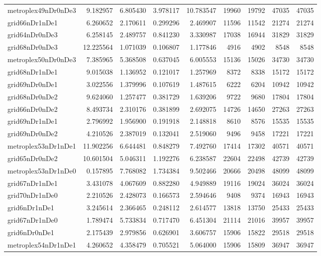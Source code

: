 \begin{longtable}{|l|r|r|r|r|r|r|r|r|}
metroplex49nDr0nDe3 & 9.182957 & 6.805430 & 3.978117 & 10.783547 & 19960 & 19792 & 47035 & 47035 \\
grid66nDr1nDe1 & 6.260652 & 2.170611 & 0.299296 & 2.469907 & 11596 & 11542 & 21274 & 21274 \\
grid64nDr0nDe3 & 6.258145 & 2.489757 & 0.841230 & 3.330987 & 17038 & 16944 & 31829 & 31829 \\
grid68nDr0nDe3 & 12.225564 & 1.071039 & 0.106807 & 1.177846 & 4916 & 4902 & 8548 & 8548 \\
metroplex50nDr0nDe3 & 7.385965 & 5.368508 & 0.637045 & 6.005553 & 15136 & 15026 & 34730 & 34730 \\
grid68nDr1nDe1 & 9.015038 & 1.136952 & 0.121017 & 1.257969 & 8372 & 8338 & 15172 & 15172 \\
grid69nDr0nDe1 & 3.022556 & 1.379996 & 0.107619 & 1.487615 & 6222 & 6204 & 10942 & 10942 \\
grid68nDr0nDe2 & 9.624060 & 1.257477 & 0.381729 & 1.639206 & 9722 & 9680 & 17804 & 17804 \\
grid66nDr0nDe2 & 8.493734 & 2.310176 & 0.381899 & 2.692075 & 14726 & 14650 & 27263 & 27263 \\
grid69nDr1nDe1 & 2.796992 & 1.956900 & 0.191918 & 2.148818 & 8610 & 8576 & 15535 & 15535 \\
grid69nDr0nDe2 & 4.210526 & 2.387019 & 0.132041 & 2.519060 & 9496 & 9458 & 17221 & 17221 \\
metroplex53nDr1nDe1 & 11.902256 & 6.644481 & 0.848279 & 7.492760 & 17414 & 17302 & 40571 & 40571 \\
grid65nDr0nDe2 & 10.601504 & 5.046311 & 1.192276 & 6.238587 & 22604 & 22498 & 42739 & 42739 \\
metroplex53nDr1nDe0 & 0.157895 & 7.768082 & 1.734384 & 9.502466 & 20666 & 20498 & 48099 & 48099 \\
grid67nDr1nDe1 & 3.431078 & 4.067609 & 0.882280 & 4.949889 & 19116 & 19024 & 36024 & 36024 \\
grid70nDr1nDe0 & 2.210526 & 2.428073 & 0.166573 & 2.594646 & 9408 & 9374 & 16943 & 16943 \\
grid6nDr1nDe1 & 3.245614 & 2.366465 & 0.248112 & 2.614577 & 13818 & 13750 & 25433 & 25433 \\
grid67nDr1nDe0 & 1.789474 & 5.733834 & 0.717470 & 6.451304 & 21114 & 21016 & 39957 & 39957 \\
grid6nDr0nDe1 & 2.175439 & 2.979856 & 0.626901 & 3.606757 & 15906 & 15822 & 29518 & 29518 \\
metroplex54nDr1nDe1 & 4.260652 & 4.358479 & 0.705521 & 5.064000 & 15906 & 15809 & 36947 & 36947 \\

\end{longtable}
